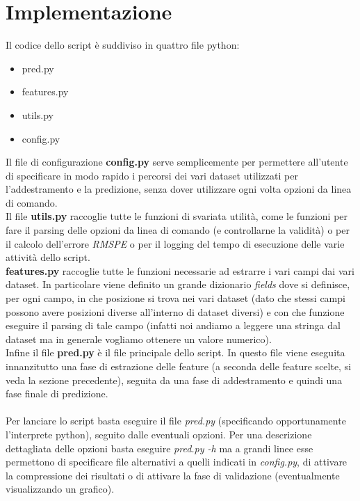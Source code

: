 \section*{Implementazione}

Il codice dello script è suddiviso in quattro file python:

\begin{itemize}
    \item pred.py
    \item features.py
    \item utils.py
    \item config.py
\end{itemize}

Il file di configurazione \textbf{config.py} serve semplicemente per permettere all'utente di specificare in modo rapido i percorsi dei vari dataset utilizzati per l'addestramento e la predizione, senza dover utilizzare ogni volta opzioni da linea di comando.\\
Il file \textbf{utils.py} raccoglie tutte le funzioni di svariata utilità, come le funzioni per fare il parsing delle opzioni da linea di comando (e controllarne la validità) o per il calcolo dell'errore \textit{RMSPE} o per il logging del tempo di esecuzione delle varie attività dello script.\\
\textbf{features.py} raccoglie tutte le funzioni necessarie ad estrarre i vari campi dai vari dataset. In particolare viene definito un grande dizionario \textit{fields} dove si definisce, per ogni campo, in che posizione si trova nei vari dataset (dato che stessi campi possono avere posizioni diverse all'interno di dataset diversi) e con che funzione eseguire il parsing di tale campo (infatti noi andiamo a leggere una stringa dal dataset ma in generale vogliamo ottenere un valore numerico).\\
Infine il file \textbf{pred.py} è il file principale dello script. In questo file viene eseguita innanzitutto una fase di estrazione delle feature (a seconda delle feature scelte, si veda la sezione precedente), seguita da una fase di addestramento e quindi una fase finale di predizione.\\
\\
Per lanciare lo script basta eseguire il file \textit{pred.py} (specificando opportunamente l'interprete python), seguito dalle eventuali opzioni. Per una descrizione dettagliata delle opzioni basta eseguire \textit{pred.py -h} ma a grandi linee esse permettono di specificare file alternativi a quelli indicati in \textit{config.py}, di attivare la compressione dei risultati o di attivare la fase di validazione (eventualmente visualizzando un grafico).\\
